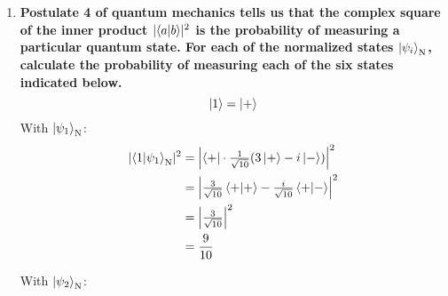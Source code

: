 \documentclass[11pt]{article}
\newcommand\abs[1]{\lvert#1\rvert}
\newcommand\Abs[1]{\left\lvert#1\right\rvert}
\begin{document}
\begin{enumerate}[label=\textbf{\arabic*.}, start=2]
{\begin{enumerate}[label=\textbf{(\alph*)}]
{\begin{align*}
                        a_3&=\tfrac 2 7 b_3i
                    \end{align*}
                    Randomly picking \(a_3=2\) and \(b_3=-7i\):
                    \begin{equation*}
                        \ket{\phi_3}=2\ket{+}-7i\ket{-}
                    \end{equation*}
                    Normalizing:
                    \begin{align*}
                        \braket{C_3\phi_3|C_3\phi_3}&=1 \\
                        1&=C_3^*(2\bra{+}+7i\bra{-})\cdot C_3(2\ket{+}-7i\ket{-}) \\
                        &=C_3C_3^*(4\braket{+|+}-49i^2\braket{-|-}) \\
                        \abs{C_3}^2&=\frac{1}{53} \\
                        C_3&=\frac{1}{\sqrt{53}}
                    \end{align*}
                    \begin{equation*}
                        \ket{\phi_3}_\mathrm{N}=\tfrac{2}{\sqrt{53}}\ket{+}-\tfrac{7i}{\sqrt{53}}\ket{-}
                    \end{equation*}
                }
                \item{
                    \textbf{\boldmath Postulate 4 of quantum mechanics tells us that the complex square of the inner product \(\abs{\braket{a|b}}^2\) is the probability of measuring a particular quantum state. For each of the normalized states \(\ket{\psi_i}_\mathrm{N}\), calculate the probability of measuring each of the six states indicated below. \[\ket{1}=\ket{+}\]}
                    With \(\ket{\psi_1}_\mathrm{N}\):
                    \begin{align*}
                        \abs{\braket{1|\psi_1}_\mathrm{N}}^2&=\Abs{\bra{+}\cdot\tfrac{1}{\sqrt{10}}(3\ket{+}-i\ket{-})}^2 \\
                        &=\Abs{\tfrac{3}{\sqrt{10}}\braket{+|+}-\tfrac{i}{\sqrt{10}}\braket{+|-}}^2 \\
                        &=\Abs{\tfrac{3}{\sqrt{10}}}^2 \\
                        &=\frac{9}{10}
                    \end{align*}
                    \par
                    With \(\ket{\psi_2}_\mathrm{N}\):
                    \begin{align*}

\end{align*}}
\end{enumerate}}
\end{enumerate}
\end{document}
